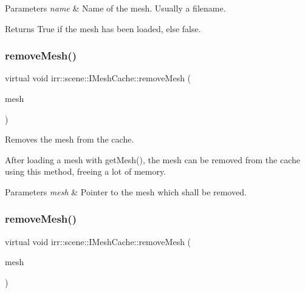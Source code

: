 \begin{DoxyParams}{Parameters}
{\em name} & Name of the mesh. Usually a filename. \\
\hline
\end{DoxyParams}
\begin{DoxyReturn}{Returns}
True if the mesh has been loaded, else false. 
\end{DoxyReturn}
\mbox{\label{classirr_1_1scene_1_1IMeshCache_aa82078b06fdcaa332b44a59e4027f921}} 
\subsubsection{\texorpdfstring{remove\+Mesh()}{removeMesh()}\hspace{0.1cm}{\footnotesize\ttfamily [1/2]}}
{\footnotesize\ttfamily virtual void irr\+::scene\+::\+I\+Mesh\+Cache\+::remove\+Mesh (\begin{DoxyParamCaption}\item[{const \hyperlink{classirr_1_1scene_1_1IMesh}{I\+Mesh} $\ast$const}]{mesh }\end{DoxyParamCaption})\hspace{0.3cm}{\ttfamily [pure virtual]}}



Removes the mesh from the cache. 

After loading a mesh with get\+Mesh(), the mesh can be removed from the cache using this method, freeing a lot of memory. 
\begin{DoxyParams}{Parameters}
{\em mesh} & Pointer to the mesh which shall be removed. \\
\hline
\end{DoxyParams}
\mbox{\label{classirr_1_1scene_1_1IMeshCache_aa82078b06fdcaa332b44a59e4027f921}} 
\subsubsection{\texorpdfstring{remove\+Mesh()}{removeMesh()}\hspace{0.1cm}{\footnotesize\ttfamily [2/2]}}
{\footnotesize\ttfamily virtual void irr\+::scene\+::\+I\+Mesh\+Cache\+::remove\+Mesh (\begin{DoxyParamCaption}\item[{const \hyperlink{classirr_1_1scene_1_1IMesh}{I\+Mesh} $\ast$const}]{mesh }\end{DoxyParamCaption})\hspace{0.3cm}{\ttfamily [pure virtual]}}



